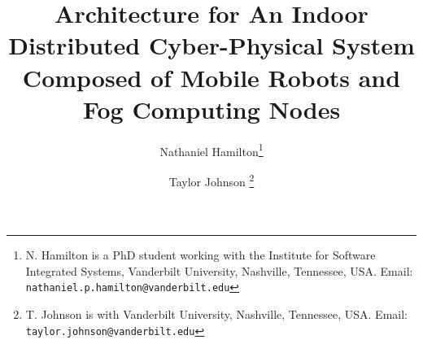 \documentclass{IEEEtran}
\begin{document}
	
%
\title{Architecture for An Indoor Distributed Cyber-Physical System Composed of Mobile Robots and Fog Computing Nodes}


\author{
  Nathaniel Hamilton\thanks{N. Hamilton is a PhD student working with the Institute for Software Integrated Systems, Vanderbilt University, Nashville, Tennessee, USA. Email: {\tt\small nathaniel.p.hamilton@vanderbilt.edu}}\hspace{0.1in}
 \and
	Taylor Johnson \thanks{T. Johnson is with Vanderbilt University, Nashville, Tennessee, USA. Email:
{\tt\small taylor.johnson@vanderbilt.edu}}\hspace{0.1in}
}


\maketitle 


\IEEEpeerreviewmaketitle









\cite{7867731}





\end{document}
